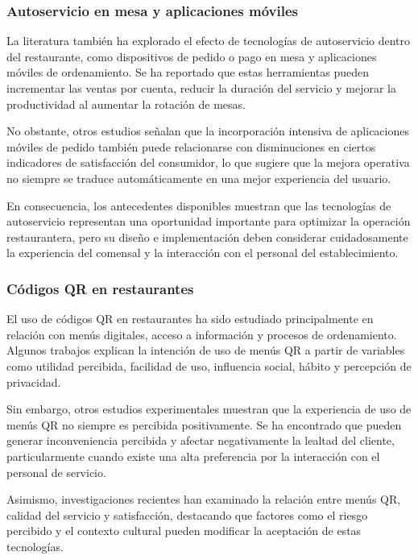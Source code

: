 \documentclass[12pt]{report}
\begin{document}
\subsubsection{Autoservicio en mesa y aplicaciones móviles}

La literatura también ha explorado el efecto de tecnologías de autoservicio dentro del restaurante, como dispositivos de pedido o pago en mesa y aplicaciones móviles de ordenamiento. Se ha reportado que estas herramientas pueden incrementar las ventas por cuenta, reducir la duración del servicio y mejorar la productividad al aumentar la rotación de mesas. \cite{tan2020tabletop,gao2018omnichannel}

No obstante, otros estudios señalan que la incorporación intensiva de aplicaciones móviles de pedido también puede relacionarse con disminuciones en ciertos indicadores de satisfacción del consumidor, lo que sugiere que la mejora operativa no siempre se traduce automáticamente en una mejor experiencia del usuario. \cite{xu2024mobile}

En consecuencia, los antecedentes disponibles muestran que las tecnologías de autoservicio representan una oportunidad importante para optimizar la operación restaurantera, pero su diseño e implementación deben considerar cuidadosamente la experiencia del comensal y la interacción con el personal del establecimiento.

\subsubsection{Códigos QR en restaurantes}

El uso de códigos QR en restaurantes ha sido estudiado principalmente en relación con menús digitales, acceso a información y procesos de ordenamiento. Algunos trabajos explican la intención de uso de menús QR a partir de variables como utilidad percibida, facilidad de uso, influencia social, hábito y percepción de privacidad. \cite{koay2024qr}

Sin embargo, otros estudios experimentales muestran que la experiencia de uso de menús QR no siempre es percibida positivamente. Se ha encontrado que pueden generar inconveniencia percibida y afectar negativamente la lealtad del cliente, particularmente cuando existe una alta preferencia por la interacción con el personal de servicio. \cite{hewage2024qr}

Asimismo, investigaciones recientes han examinado la relación entre menús QR, calidad del servicio y satisfacción, destacando que factores como el riesgo percibido y el contexto cultural pueden modificar la aceptación de estas tecnologías. \cite{yigitoglu2025qr}
\end{document}
